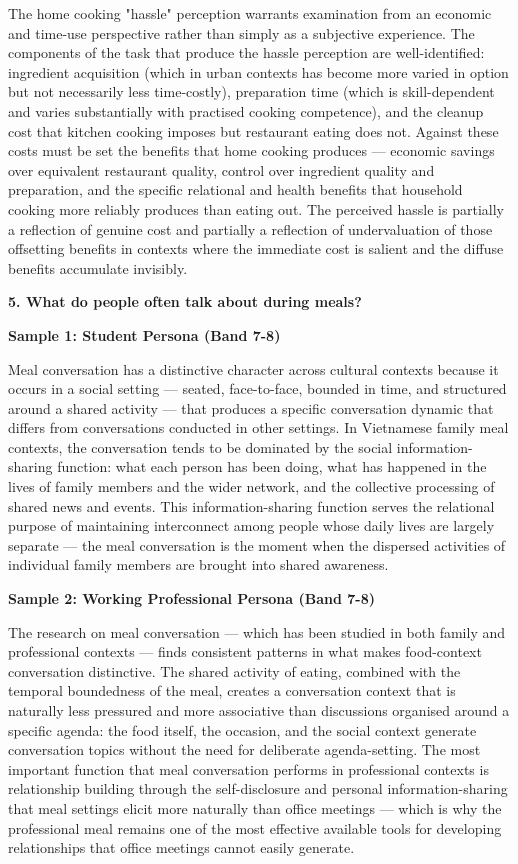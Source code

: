 The home cooking "hassle" perception warrants examination from an economic and time-use perspective rather than simply as a subjective experience. The components of the task that produce the hassle perception are well-identified: ingredient acquisition (which in urban contexts has become more varied in option but not necessarily less time-costly), preparation time (which is skill-dependent and varies substantially with practised cooking competence), and the cleanup cost that kitchen cooking imposes but restaurant eating does not. Against these costs must be set the benefits that home cooking produces — economic savings over equivalent restaurant quality, control over ingredient quality and preparation, and the specific relational and health benefits that household cooking more reliably produces than eating out. The perceived hassle is partially a reflection of genuine cost and partially a reflection of undervaluation of those offsetting benefits in contexts where the immediate cost is salient and the diffuse benefits accumulate invisibly.

\separator

\begin{ieltsquestion}
\textbf{5. What do people often talk about during meals?}
\end{ieltsquestion}
\textbf{Sample 1: Student Persona (Band 7-8)}

Meal conversation has a distinctive character across cultural contexts because it occurs in a social setting — seated, face-to-face, bounded in time, and structured around a shared activity — that produces a specific conversation dynamic that differs from conversations conducted in other settings. In Vietnamese family meal contexts, the conversation tends to be dominated by the social information-sharing function: what each person has been doing, what has happened in the lives of family members and the wider network, and the collective processing of shared news and events. This information-sharing function serves the relational purpose of maintaining interconnect among people whose daily lives are largely separate — the meal conversation is the moment when the dispersed activities of individual family members are brought into shared awareness.

\textbf{Sample 2: Working Professional Persona (Band 7-8)}

The research on meal conversation — which has been studied in both family and professional contexts — finds consistent patterns in what makes food-context conversation distinctive. The shared activity of eating, combined with the temporal boundedness of the meal, creates a conversation context that is naturally less pressured and more associative than discussions organised around a specific agenda: the food itself, the occasion, and the social context generate conversation topics without the need for deliberate agenda-setting. The most important function that meal conversation performs in professional contexts is relationship building through the self-disclosure and personal information-sharing that meal settings elicit more naturally than office meetings — which is why the professional meal remains one of the most effective available tools for developing relationships that office meetings cannot easily generate.

